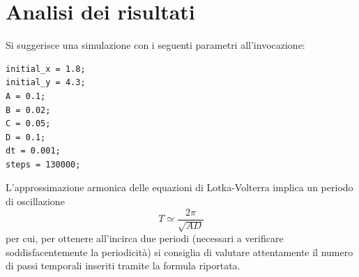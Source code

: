 \section{Analisi dei risultati}

Si suggerisce una simulazione con i seguenti parametri all'invocazione:
\begin{verbatim}
initial_x = 1.8;
initial_y = 4.3;
A = 0.1;
B = 0.02;
C = 0.05;
D = 0.1;
dt = 0.001;
steps = 130000;
\end{verbatim}

L'approssimazione armonica delle equazioni di Lotka-Volterra implica un periodo di oscillazione
\[
    T \simeq \frac{2 \pi}{\sqrt{A D}}
\]
per cui, per ottenere all'incirca due periodi (necessari a verificare soddisfacentemente la periodicità) si consiglia di valutare attentamente il numero di passi temporali inseriti tramite la formula riportata.